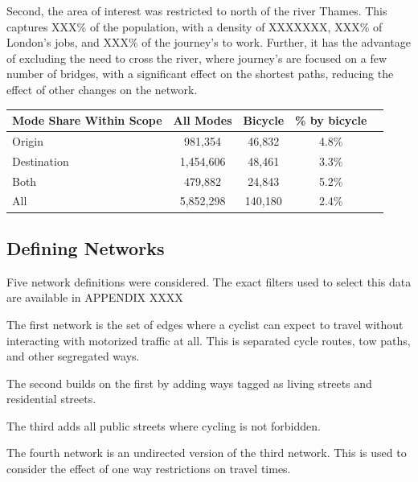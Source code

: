 \documentclass[11pt]{article} %
\begin{document}
Second, the area of interest was restricted to north of the river Thames. This captures XXX\% of the population, with a density of XXXXXXX, XXX\% of London's jobs, and XXX\% of the journey's to work. Further, it has the advantage of excluding the need to cross the river, where journey's are focused on a few number of bridges, with a significant effect on the shortest paths, reducing the effect of other changes on the network. 





\begin{table}[]
\begin{tabular}{l|cccl}
 Mode Share Within Scope & All Modes & Bicycle & \% by bicycle &  \\
 \hline
 Origin&  981,354 & 46,832 & 4.8\% &  \\
 Destination& 1,454,606 & 48,461 & 3.3\% &  \\
 Both& 479,882 & 24,843 & 5.2\% & \\
 All & 5,852,298 & 140,180 & 2.4\% \\ 
\end{tabular}
\end{table}




 
\subsection{Defining Networks}

Five network definitions were considered. The exact filters used to select this data are available in APPENDIX XXXX 

The first network is the set of edges where a cyclist can expect to travel without interacting with motorized traffic at all. This is separated cycle routes, tow paths, and other segregated ways. 

The second builds on the first by adding ways tagged as living streets and residential streets.

The third adds all public streets where cycling is not forbidden. 

The fourth network is an undirected version of the third network. This is used to consider the effect of one way restrictions on travel times. 
\end{document}
